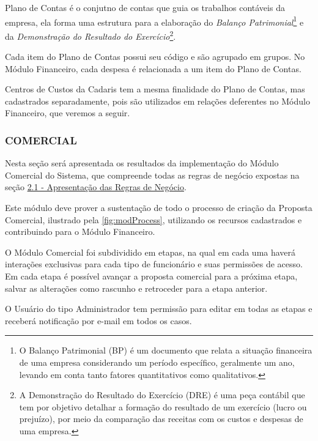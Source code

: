 \documentclass[
  12pt,				%
  openany,
  oneside,
  a4paper,			%
  english,			%
  brazil
]{article}
\numberwithin{figure}{section}
\numberwithin{table}{section}
\newcounter{subsubsubsection}[subsubsection]
\begin{document}

Plano de Contas é o conjutno de contas que guia os trabalhos contáveis da empresa, ela forma uma estrutura para a elaboração do \textit{Balanço Patrimonial}\footnote{O Balanço Patrimonial (BP) é um documento que relata a situação financeira de uma empresa considerando um período específico, geralmente um ano, levando em conta tanto fatores quantitativos como qualitativos.} e da \textit{Demonstração do Resultado do Exercício}\footnote{A Demonstração do Resultado do Exercício (DRE) é uma peça contábil que tem por objetivo detalhar a formação do resultado de um exercício (lucro ou prejuízo), por meio da comparação das receitas com os custos e despesas de uma empresa.}.

Cada item do Plano de Contas possui seu código e são agrupado em grupos. No Módulo Financeiro, cada despesa é relacionada a um item do Plano de Contas.



Centros de Custos da Cadaris tem a mesma finalidade do Plano de Contas, mas cadastrados separadamente, pois são utilizados em relações deferentes no Módulo Financeiro, que veremos a seguir.


\subsubsection{COMERCIAL}
\label{sec:2.3.2}
  
Nesta seção será apresentada os resultados da implementação do Módulo Comercial do Sistema, que compreende todas as regras de negócio expostas na seção \hyperref[sec:2.1]{2.1 - Apresentação das Regras de Negócio}.

Este módulo deve prover a sustentação de todo o processo de criação da Proposta Comercial, ilustrado pela \autoref{fig:modProcess}, utilizando os recursos cadastrados e contribuindo para o Módulo Financeiro. 

O Módulo Comercial foi subdividido em etapas, na qual em cada uma haverá interações exclusivas para cada tipo de funcionário e suas permissões de acesso. Em cada etapa é possível avançar a proposta comercial para a próxima etapa, salvar as alterações como rascunho e retroceder para a etapa anterior. 

O Usuário do tipo Administrador tem permissão para editar em todas as etapas e receberá notificação por e-mail em todos os casos.


\end{document}
